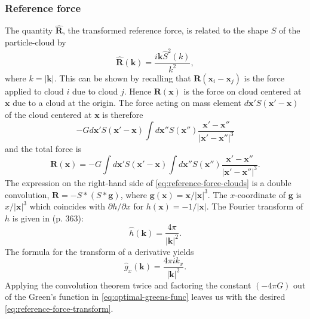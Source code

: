 \subsubsection{Reference force}
The quantity $\mathbf{\hat{R}}$, the transformed reference force, is related to the shape $S$ of the particle-cloud by
\begin{equation}\label{eq:reference-force-transform}
    \mathbf{\hat{R}}(\mathbf{k}) = \frac{i\mathbf{k}\hat{S}^2(k)}{k^2},
\end{equation}
where $k = |\mathbf{k}|$.
This can be shown by recalling that $\mathbf{R}(\mathbf{x}_i - \mathbf{x}_j)$ is the force applied to cloud $i$ due to cloud $j$.
Hence $\mathbf{R}(\mathbf{x})$ is the force on cloud centered at $\mathbf{x}$ due to a cloud at the origin.
The force acting on mass element $d\mathbf{x}' S(\mathbf{x}' - \mathbf{x})$ of the cloud centered at $\mathbf{x}$ is therefore
\begin{equation*}
    -G d\mathbf{x}'S(\mathbf{x}' - \mathbf{x}) \int d\mathbf{x}'' S(\mathbf{x}'')\frac{\mathbf{x}' - \mathbf{x}''}{|\mathbf{x}' - \mathbf{x}''|^3}
\end{equation*}
and the total force is
\begin{equation}\label{eq:reference-force-clouds}
    \mathbf{R}(\mathbf{x}) = -G \int d\mathbf{x}'S(\mathbf{x}' - \mathbf{x}) \int d\mathbf{x}'' S(\mathbf{x}'')\frac{\mathbf{x}' - \mathbf{x}''}{|\mathbf{x}' - \mathbf{x}''|^3}.
\end{equation}
The expression on the right-hand side of \autoref{eq:reference-force-clouds} is a double convolution, $\mathbf{R} = -S * (S * \mathbf{g})$, where $\mathbf{g}(\mathbf{x}) = \mathbf{x}/|\mathbf{x}|^3.$
The $x$-coordinate of $\mathbf{g}$ is $x/|\mathbf{x}|^3$ which coincides with $\partial h / \partial x$ for $h(\mathbf{x}) = -1/|\mathbf{x}|.$
The Fourier transform of $h$ is given in \cite{gelfand1964generalized} (p. 363):
\begin{equation*}
    \hat{h}(\mathbf{k}) = \frac{4\pi}{|\mathbf{k}|^2}.
\end{equation*}
The formula for the transform of a derivative yields
\begin{equation*}
    \hat{g}_x(\mathbf{k}) = \frac{4\pi i k_x}{|\mathbf{k}|^2}.
\end{equation*}
Applying the convolution theorem twice and factoring the constant $(-4\pi G)$ out of the Green's function in \autoref{eq:optimal-greens-func} leaves us with the desired \autoref{eq:reference-force-transform}.

